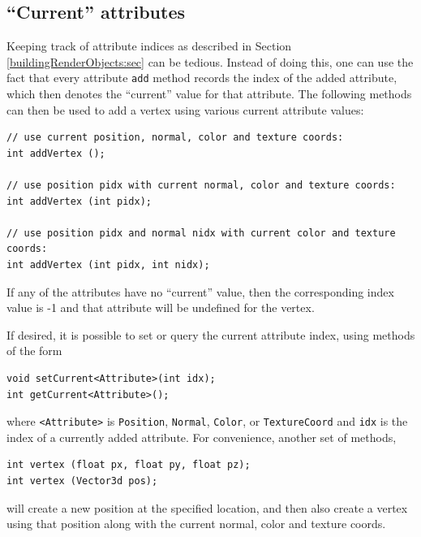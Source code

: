 \subsection{``Current'' attributes}

Keeping track of attribute indices as described in Section
\ref{buildingRenderObjects:sec} can be tedious. Instead of doing this,
one can use the fact that every attribute {\tt add} method records the
index of the added attribute, which then denotes the ``current'' value
for that attribute.  The following methods can then be used to add a
vertex using various current attribute values:
%
\begin{lstlisting}[]
// use current position, normal, color and texture coords:
int addVertex ();              

// use position pidx with current normal, color and texture coords:
int addVertex (int pidx);

// use position pidx and normal nidx with current color and texture coords:
int addVertex (int pidx, int nidx);
\end{lstlisting}
If any of the attributes have no ``current'' value, then the
corresponding index value is -1 and that attribute will be undefined
for the vertex.

If desired, it is possible to set or query the current attribute
index, using methods of the form
%
\begin{lstlisting}[]
void setCurrent<Attribute>(int idx);
int getCurrent<Attribute>();
\end{lstlisting}
%
where {\tt <Attribute>} is {\tt Position}, {\tt Normal}, {\tt Color},
or {\tt TextureCoord} and {\tt idx} is the index of a currently added
attribute.
%
For convenience, another set of methods,
%
\begin{lstlisting}[]
int vertex (float px, float py, float pz);
int vertex (Vector3d pos);
\end{lstlisting}
%
will create a new position at the specified location, and then also create
a vertex using that position along with the current normal, color and
texture coords.


